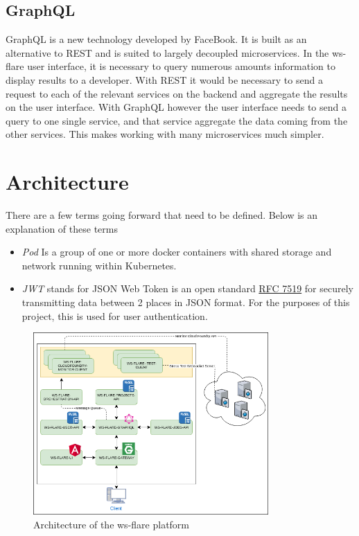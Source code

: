 \subsection{GraphQL}

GraphQL is a new technology developed by FaceBook. It is built as an alternative to REST and is suited to largely decoupled microservices. In the ws-flare user interface, it is necessary to query numerous amounts information to display results to a developer. With REST it would be necessary to send a request to each of the relevant services on the backend and aggregate the results on the user interface. With GraphQL however the user interface needs to send a query to one single service, and that service aggregate the data coming from the other services. This makes working with many microservices much simpler.

\section{Architecture}

There are a few terms going forward that need to be defined. Below is an explanation of these terms

\begin{itemize}
  \item \emph{Pod} Is a group of one or more docker containers with shared storage and network running within Kubernetes.
  \item \emph{JWT} stands for JSON Web Token is an open standard \href{https://tools.ietf.org/html/rfc7519}{RFC 7519} for securely transmitting data between 2 places in JSON format. For the purposes of this project, this is used for user authentication.
\end{itemize}

\begin{figure}[!h]
  \centering
    \includegraphics[width=0.8\textwidth]{figures/architecture.png}
    \caption{Architecture of the ws-flare platform}
    \label{fig:https-handshake}
\end{figure}

